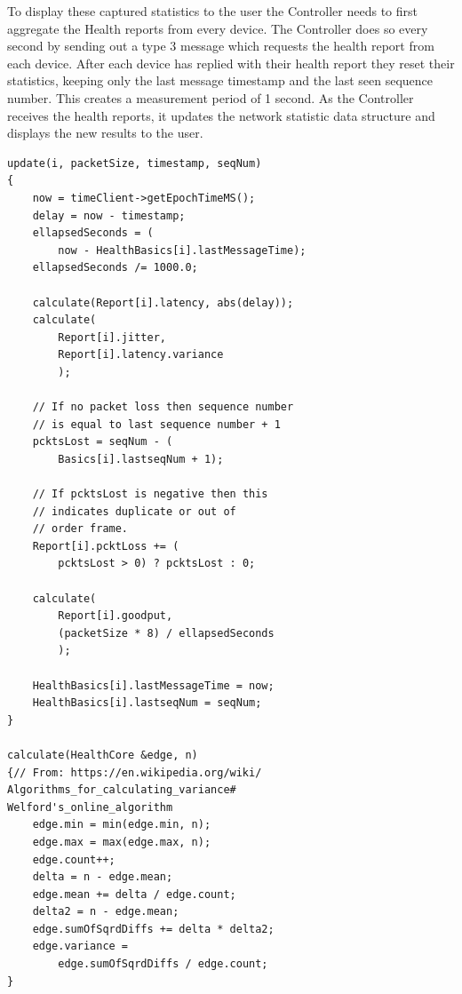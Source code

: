 \documentclass[letterpaper,twocolumn,10pt]{article}
\begin{document}
To display these captured statistics to the user the Controller needs to first aggregate the Health reports from every device. The Controller does so every second by sending out a type 3 message which requests the health report from each device. After each device has replied with their health report they reset their statistics, keeping only the last message timestamp and the last seen sequence number. This creates a measurement period of 1 second. As the Controller receives the health reports, it updates the network statistic data structure and displays the new results to the user.
\begin{verbatim}
update(i, packetSize, timestamp, seqNum)
{
    now = timeClient->getEpochTimeMS();
    delay = now - timestamp;
    ellapsedSeconds = (
        now - HealthBasics[i].lastMessageTime);
    ellapsedSeconds /= 1000.0;

    calculate(Report[i].latency, abs(delay));
    calculate(
        Report[i].jitter,
        Report[i].latency.variance
        );

    // If no packet loss then sequence number
    // is equal to last sequence number + 1
    pcktsLost = seqNum - (
        Basics[i].lastseqNum + 1);

    // If pcktsLost is negative then this
    // indicates duplicate or out of 
    // order frame.
    Report[i].pcktLoss += (
        pcktsLost > 0) ? pcktsLost : 0;

    calculate(
        Report[i].goodput,
        (packetSize * 8) / ellapsedSeconds
        );
    
    HealthBasics[i].lastMessageTime = now;
    HealthBasics[i].lastseqNum = seqNum;
}

calculate(HealthCore &edge, n)
{// From: https://en.wikipedia.org/wiki/
Algorithms_for_calculating_variance#
Welford's_online_algorithm
    edge.min = min(edge.min, n);
    edge.max = max(edge.max, n);
    edge.count++;
    delta = n - edge.mean;
    edge.mean += delta / edge.count;
    delta2 = n - edge.mean;
    edge.sumOfSqrdDiffs += delta * delta2;
    edge.variance = 
        edge.sumOfSqrdDiffs / edge.count;
}
\end{verbatim}
\end{document}
